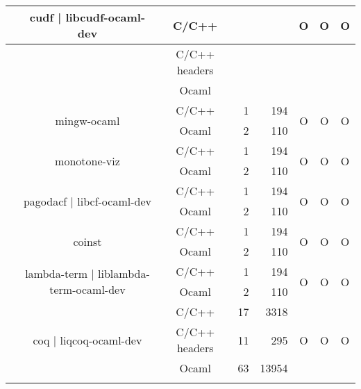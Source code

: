 \documentclass[11pt,a4paper]{article}
\begin{document}
\begin{table}[h,t]
\begin{tabular}{|>{\centering}m{3cm}| c|c|r|r| c| c|c|}
 &\multirow{3}{3cm}{cudf | libcudf-ocaml-dev} & C/C++ &  &  & \multirow{3}{*}{O} & \multirow{3}{*}{O} & \multirow{3}{*}{O}\\
 \cline{3-5}
 & &                           C/C++ headers &  &  & & & \\
 \cline{3-5}
 & &                          Ocaml &  &  & & & \\
 \cline{2-8}


 &\multirow{2}{3cm}{mingw-ocaml} & C/C++ & 1 & 194  & \multirow{2}{*}{O} & \multirow{2}{*}{O} &

 \multirow{2}{*}{O}\\
 \cline{3-5}   
 &                                  & Ocaml & 2 & 110  & & & \\       
 \cline{2-8}


 &\multirow{2}{3cm}{monotone-viz} & C/C++ & 1 & 194  & \multirow{2}{*}{O} & \multirow{2}{*}{O} &

 \multirow{2}{*}{O}\\
 \cline{3-5}   
 &                                  & Ocaml & 2 & 110  & & & \\       
 \cline{2-8}

 &\multirow{2}{3cm}{pagodacf | libcf-ocaml-dev} & C/C++ & 1 & 194  & \multirow{2}{*}{O} & \multirow{2}{*}{O} &

 \multirow{2}{*}{O}\\
 \cline{3-5}   
 &                                  & Ocaml & 2 & 110  & & & \\       
 \cline{2-8}



 &\multirow{2}{3cm}{coinst} & C/C++ & 1 & 194  & \multirow{2}{*}{O} & \multirow{2}{*}{O} &

 \multirow{2}{*}{O}\\
 \cline{3-5}   
 &                                  & Ocaml & 2 & 110  & & & \\       
 \cline{2-8}


 &\multirow{2}{3cm}{lambda-term | liblambda-term-ocaml-dev} & C/C++ & 1 & 194  & \multirow{2}{*}{O} & \multirow{2}{*}{O} &

 \multirow{2}{*}{O}\\
 \cline{3-5}   
 &                                  & Ocaml & 2 & 110  & & & \\       
 \cline{2-8}


& \multirow{3}{3cm}{coq | liqcoq-ocaml-dev } & C/C++ & 17 & 3318 & \multirow{3}{*}{O} & \multirow{3}{*}{O} & \multirow{3}{*}{O}\\
 \cline{3-5}
 &  &                           C/C++ headers & 11 & 295 & & & \\
 \cline{3-5}
 & &                           Ocaml & 63 & 13954 & & & \\
 \cline{2-8}


\end{tabular}
\end{table}
\end{document}
